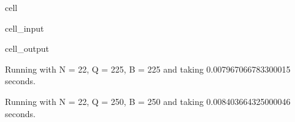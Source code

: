 \documentclass[letterpaper,10pt,english]{jupyterBook}
\begin{document}
\begin{sphinxuseclass}{cell}\begin{sphinxVerbatimInput}

\begin{sphinxuseclass}{cell_input}
\begin{sphinxVerbatim}[commandchars=\\\{\}]
    
    
    
    
\end{sphinxVerbatim}

\end{sphinxuseclass}\end{sphinxVerbatimInput}
\begin{sphinxVerbatimOutput}

\begin{sphinxuseclass}{cell_output}
\begin{sphinxVerbatim}[commandchars=\\\{\}]
Running with N = 2\PYGZca{}2, Q = 2\PYGZca{}25, B = 2\PYGZca{}25 and taking 0.007967066783300015 seconds.
\end{sphinxVerbatim}

\begin{sphinxVerbatim}[commandchars=\\\{\}]
Running with N = 2\PYGZca{}2, Q = 2\PYGZca{}50, B = 2\PYGZca{}50 and taking 0.008403664325000046 seconds.
\end{sphinxVerbatim}


\end{sphinxuseclass}
\end{sphinxVerbatimOutput}
\end{sphinxuseclass}
\end{document}
